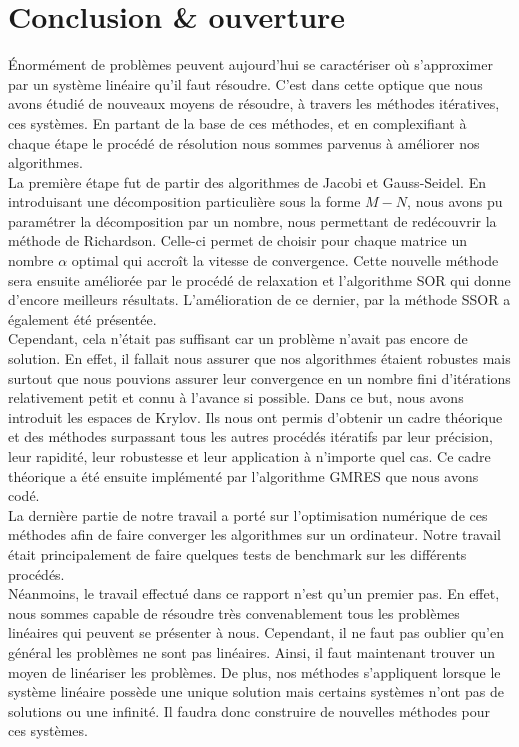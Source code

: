 \chapter{Conclusion \& ouverture}

Énormément de problèmes peuvent aujourd'hui se caractériser où s'approximer par un système linéaire qu'il faut résoudre. C'est dans cette optique que nous avons étudié de nouveaux moyens de résoudre, à travers les méthodes itératives, ces systèmes. En partant de la base de ces méthodes, et en complexifiant à chaque étape le procédé de résolution nous sommes parvenus à améliorer nos algorithmes.\\

La première étape fut de partir des algorithmes de Jacobi et Gauss-Seidel. En introduisant une décomposition particulière sous la forme $M - N$, nous avons pu paramétrer la décomposition par un nombre, nous permettant de redécouvrir la méthode de Richardson. Celle-ci permet de choisir pour chaque matrice un nombre $\alpha$ optimal qui accroît la vitesse de convergence. Cette nouvelle méthode sera ensuite améliorée par le procédé de relaxation et l'algorithme SOR qui donne d'encore meilleurs résultats. L'amélioration de ce dernier, par la méthode SSOR a également été présentée. \\

Cependant, cela n'était pas suffisant car un problème n'avait pas encore de solution. En effet, il fallait nous assurer que nos algorithmes étaient robustes mais surtout que nous pouvions assurer leur convergence en un nombre fini d'itérations relativement petit et connu à l'avance si possible. Dans ce but, nous avons introduit les espaces de Krylov. Ils nous ont permis d'obtenir un cadre théorique et des méthodes surpassant tous les autres procédés itératifs par leur précision, leur rapidité, leur robustesse et leur application à n'importe quel cas. Ce cadre théorique a été ensuite implémenté par l'algorithme GMRES que nous avons codé.\\

La dernière partie de notre travail a porté sur l'optimisation numérique de ces méthodes afin de faire converger les algorithmes sur un ordinateur. Notre travail était principalement de faire quelques tests de benchmark sur les différents procédés.\\ 

Néanmoins, le travail effectué dans ce rapport n'est qu'un premier pas. En effet, nous sommes capable de résoudre très convenablement tous les problèmes linéaires qui peuvent se présenter à nous. Cependant, il ne faut pas oublier qu'en général les problèmes ne sont pas linéaires. Ainsi, il faut maintenant trouver un moyen de linéariser les problèmes. De plus, nos méthodes s'appliquent lorsque le système linéaire possède une unique solution mais certains systèmes n'ont pas de solutions ou une infinité. Il faudra donc construire de nouvelles méthodes pour ces systèmes.